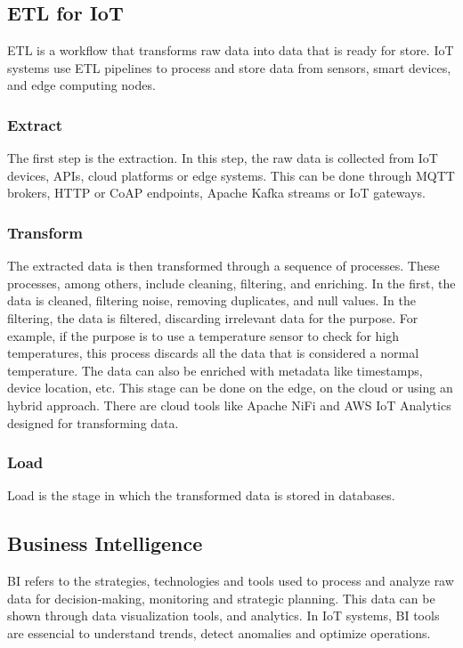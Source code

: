 \subsection{ETL for IoT}
\gls{ETL} is a workflow that transforms raw data into data that is ready for
store. IoT systems use ETL pipelines to process and store data from sensors,
smart devices, and edge computing nodes.

\subsubsection{Extract}
The first step is the extraction. In this step, the raw data is collected from
IoT devices, APIs, cloud platforms or edge systems. This can be done through
MQTT brokers, HTTP or CoAP endpoints, Apache Kafka streams or IoT gateways.

\subsubsection{Transform}
The extracted data is then transformed through a sequence of processes. These
processes, among others, include cleaning, filtering, and enriching.
In the first, the data is cleaned, filtering noise, removing duplicates, and
null values. In the filtering, the data is filtered, discarding irrelevant data
for the purpose. For example, if the purpose is to use a temperature sensor to
check for high temperatures, this process discards all the data that is
considered a normal temperature. The data can also be enriched with metadata
like timestamps, device location, etc. This stage can be done on the edge, on
the cloud or using an hybrid approach. There are cloud tools like Apache NiFi
and AWS IoT Analytics designed for transforming data.

\subsubsection{Load}
Load is the stage in which the transformed data is stored in databases.

\subsection{Business Intelligence}
\gls{BI} refers to the strategies, technologies and tools used to process and
analyze raw data for decision-making, monitoring and strategic planning.
This data can be shown through data visualization tools, and analytics.
In IoT systems, \gls{BI} tools are essencial to understand trends, detect
anomalies and optimize operations.

